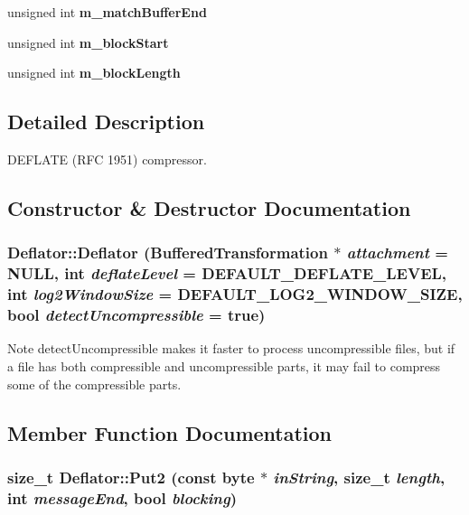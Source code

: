 \begin{DoxyCompactItemize}
\item 
\hypertarget{class_deflator_ab42368c1d6f17579f3b5651fbf9ace6f}{
unsigned int {\bfseries m\_\-matchBufferEnd}}
\label{class_deflator_ab42368c1d6f17579f3b5651fbf9ace6f}

\item 
\hypertarget{class_deflator_af664ac5ab288e3099324ef2ad051719e}{
unsigned int {\bfseries m\_\-blockStart}}
\label{class_deflator_af664ac5ab288e3099324ef2ad051719e}

\item 
\hypertarget{class_deflator_a7bbef1e0fe539c42509a7bebefc7cb1e}{
unsigned int {\bfseries m\_\-blockLength}}
\label{class_deflator_a7bbef1e0fe539c42509a7bebefc7cb1e}

\end{DoxyCompactItemize}


\subsection{Detailed Description}
DEFLATE (RFC 1951) compressor. 

\subsection{Constructor \& Destructor Documentation}
\hypertarget{class_deflator_aee81a8ccc99647834b079bbcb70e4027}{
\subsubsection[{Deflator}]{\setlength{\rightskip}{0pt plus 5cm}Deflator::Deflator ({\bf BufferedTransformation} $\ast$ {\em attachment} = {\ttfamily NULL}, \/  int {\em deflateLevel} = {\ttfamily DEFAULT\_\-DEFLATE\_\-LEVEL}, \/  int {\em log2WindowSize} = {\ttfamily DEFAULT\_\-LOG2\_\-WINDOW\_\-SIZE}, \/  bool {\em detectUncompressible} = {\ttfamily true})}}
\label{class_deflator_aee81a8ccc99647834b079bbcb70e4027}
\begin{DoxyNote}{Note}
detectUncompressible makes it faster to process uncompressible files, but if a file has both compressible and uncompressible parts, it may fail to compress some of the compressible parts. 
\end{DoxyNote}


\subsection{Member Function Documentation}
\hypertarget{class_deflator_ab3ba26f52807a9b5d4af6948d56cd4a9}{
\subsubsection[{Put2}]{\setlength{\rightskip}{0pt plus 5cm}size\_\-t Deflator::Put2 (const byte $\ast$ {\em inString}, \/  size\_\-t {\em length}, \/  int {\em messageEnd}, \/  bool {\em blocking})}}
\label{class_deflator_ab3ba26f52807a9b5d4af6948d56cd4a9}


